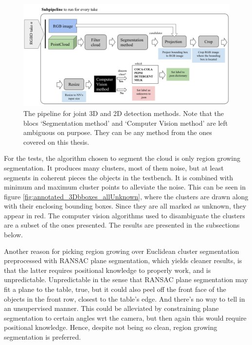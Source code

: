\documentclass[../main.tex]{subfiles}
\begin{document}
\begin{figure}[H]
    \centering
    \includegraphics[width=1\linewidth]{images/2D_3D_pipeline.png}
    \caption{The pipeline for joint 3D and 2D detection methods. Note that the blocs `Segmentation method' and `Computer Vision method' are left ambiguous on purpose. They can be any method from the ones covered on this thesis.}
    \label{fig:2D_3D_pipeline}
\end{figure}


For the tests, the algorithm chosen to segment the cloud is only region growing segmentation. It produces many clusters, most of them noise, but at least segments in coherent pieces the objects in the testbench. It is combined with minimum and maximum cluster points to alleviate the noise. This can be seen in figure \ref{fig:annotated_3Dbboxes_allUnknown}, where the clusters are drawn along with their enclosing bounding boxes. Since they are all marked as unknown, they appear in red. The computer vision algorithms used to disambiguate the clusters are a subset of the ones presented. The results are presented in the subsections below.

Another reason for picking region growing over Euclidean cluster segmentation preprocessed with RANSAC plane segmentation, which yields cleaner results, is that the latter requires positional knowledge to properly work, and is unpredictable. Unpredictable in the sense that RANSAC plane segmentation may fit a plane to the table, true, but it could also peel off the front face of the objects in the front row, closest to the table's edge. And there's no way to tell in an unsupervised manner. This could be alleviated by constraining plane segmentation to certain angles wrt the camera, but then again this would require positional knowledge. Hence, despite not being so clean, region growing segmentation is preferred.
\end{document}
